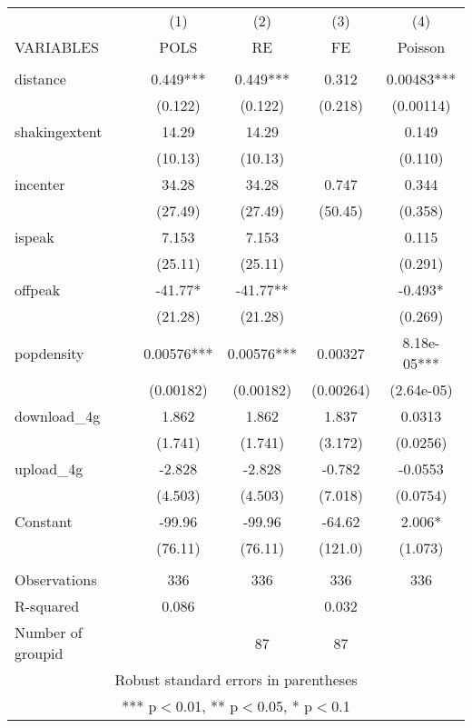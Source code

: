 \documentclass[]{article}
\begin{document}
\begin{tabular}{lcccc} \hline
 & (1) & (2) & (3) & (4) \\
VARIABLES & POLS & RE & FE & Poisson \\ \hline
 &  &  &  &  \\
distance & 0.449*** & 0.449*** & 0.312 & 0.00483*** \\
 & (0.122) & (0.122) & (0.218) & (0.00114) \\
shakingextent & 14.29 & 14.29 &  & 0.149 \\
 & (10.13) & (10.13) &  & (0.110) \\
incenter & 34.28 & 34.28 & 0.747 & 0.344 \\
 & (27.49) & (27.49) & (50.45) & (0.358) \\
ispeak & 7.153 & 7.153 &  & 0.115 \\
 & (25.11) & (25.11) &  & (0.291) \\
offpeak & -41.77* & -41.77** &  & -0.493* \\
 & (21.28) & (21.28) &  & (0.269) \\
popdensity & 0.00576*** & 0.00576*** & 0.00327 & 8.18e-05*** \\
 & (0.00182) & (0.00182) & (0.00264) & (2.64e-05) \\
download\_4g & 1.862 & 1.862 & 1.837 & 0.0313 \\
 & (1.741) & (1.741) & (3.172) & (0.0256) \\
upload\_4g & -2.828 & -2.828 & -0.782 & -0.0553 \\
 & (4.503) & (4.503) & (7.018) & (0.0754) \\
Constant & -99.96 & -99.96 & -64.62 & 2.006* \\
 & (76.11) & (76.11) & (121.0) & (1.073) \\
 &  &  &  &  \\
Observations & 336 & 336 & 336 & 336 \\
R-squared & 0.086 &  & 0.032 &  \\
 Number of groupid &  & 87 & 87 &  \\ \hline
\multicolumn{5}{c}{ Robust standard errors in parentheses} \\
\multicolumn{5}{c}{ *** p$<$0.01, ** p$<$0.05, * p$<$0.1} \\
\end{tabular}
\end{document}
